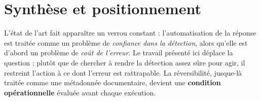 \section{Synth\`ese et positionnement}
L'\'etat de l'art fait appara\^itre un verrou constant : l'automatisation de la
r\'eponse est trait\'ee comme un probl\`eme de \emph{confiance dans la d\'etection}, alors
qu'elle est d'abord un probl\`eme de \emph{co\^ut de l'erreur}. Le travail pr\'esent\'e ici
d\'eplace la question : plut\^ot que de chercher \`a rendre la d\'etection assez s\^ure pour
agir, il restreint l'action \`a ce dont l'erreur est rattrapable. La
r\'eversibilit\'e, jusque-l\`a trait\'ee comme une m\'etadonn\'ee documentaire, devient une
\textbf{condition op\'erationnelle} \'evalu\'ee avant chaque ex\'ecution.
